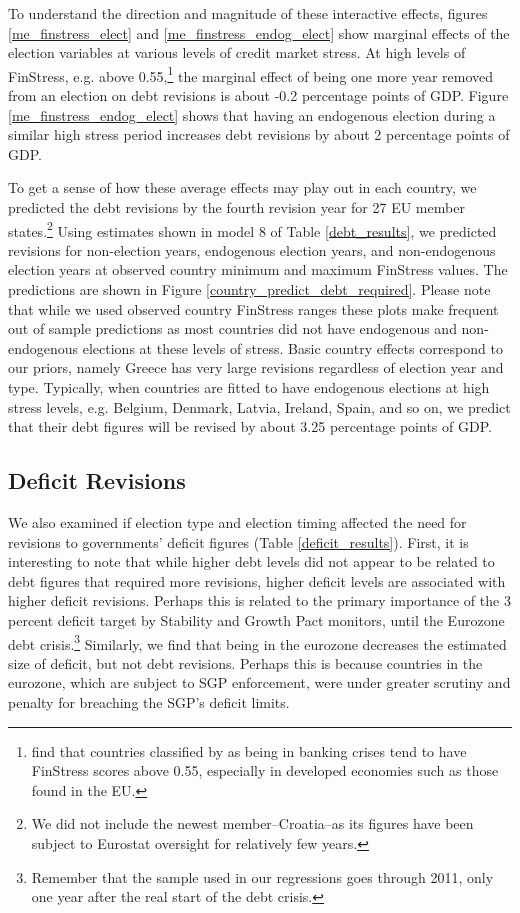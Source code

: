 \documentclass[]{article}
\begin{document}
To understand the direction and magnitude of these interactive effects, figures \ref{me_finstress_elect} and \ref{me_finstress_endog_elect} show marginal effects of the election variables at various levels of credit market stress. At high levels of FinStress, e.g. above 0.55,\footnote{\cite{finstress_paper} find that countries classified by \cite{Laeven2012} as being in banking crises tend to have FinStress scores above 0.55, especially in developed economies such as those found in the EU.} the marginal effect of being one more year removed from an election on debt revisions is about -0.2 percentage points of GDP. Figure \ref{me_finstress_endog_elect} shows that having an endogenous election during a similar high stress period increases debt revisions by about 2 percentage points of GDP.

To get a sense of how these average effects may play out in each country, we predicted the debt revisions by the fourth revision year for 27 EU member states.\footnote{We did not include the newest member--Croatia--as its figures have been subject to Eurostat oversight for relatively few years.} Using estimates shown in model 8 of Table \ref{debt_results}, we predicted revisions for non-election years, endogenous election years, and non-endogenous election years at observed country minimum and maximum FinStress values. The predictions are shown in Figure \ref{country_predict_debt_required}. Please note that while we used observed country FinStress ranges these plots make frequent out of sample predictions as most countries did not have endogenous and non-endogenous elections at these levels of stress. Basic country effects correspond to our priors, namely Greece has very large revisions regardless of election year and type. Typically, when countries are fitted to have endogenous elections at high stress levels, e.g. Belgium, Denmark, Latvia, Ireland, Spain, and so on, we predict that their debt figures will be revised by about 3.25 percentage points of GDP.

\subsection{Deficit Revisions}

We also examined if election type and election timing affected the need for revisions to governments' deficit figures (Table \ref{deficit_results}). First, it is interesting to note that while higher debt levels did not appear to be related to debt figures that required more revisions, higher deficit levels are associated with higher deficit revisions. Perhaps this is related to the primary importance of the 3 percent deficit target by Stability and Growth Pact monitors, until the Eurozone debt crisis.\footnote{Remember that the sample used in our regressions goes through 2011, only one year after the real start of the debt crisis.} Similarly, we find that being in the eurozone decreases the estimated size of deficit, but not debt revisions. Perhaps this is because countries in the eurozone, which are subject to SGP enforcement, were under greater scrutiny and penalty for breaching the SGP's deficit limits.
\end{document}
